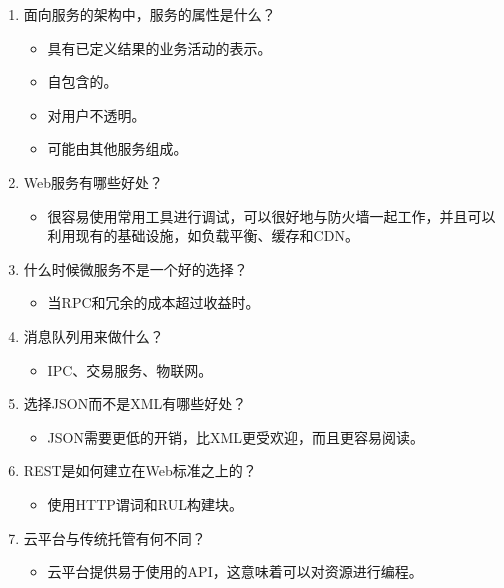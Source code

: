 \begin{enumerate}
\item
面向服务的架构中，服务的属性是什么？
\begin{itemize}
\item 
具有已定义结果的业务活动的表示。

\item 
自包含的。

\item 
对用户不透明。

\item 
可能由其他服务组成。
\end{itemize}

\item
Web服务有哪些好处？
\begin{itemize}
\item 
很容易使用常用工具进行调试，可以很好地与防火墙一起工作，并且可以利用现有的基础设施，如负载平衡、缓存和CDN。
\end{itemize}

\item
什么时候微服务不是一个好的选择？
\begin{itemize}
\item 
当RPC和冗余的成本超过收益时。
\end{itemize}

\item
消息队列用来做什么？
\begin{itemize}
\item 
IPC、交易服务、物联网。
\end{itemize}

\item
选择JSON而不是XML有哪些好处？
\begin{itemize}
\item 
JSON需要更低的开销，比XML更受欢迎，而且更容易阅读。
\end{itemize}

\item
REST是如何建立在Web标准之上的？
\begin{itemize}
\item 
使用HTTP谓词和RUL构建块。
\end{itemize}

\item
云平台与传统托管有何不同？
\begin{itemize}
\item 
云平台提供易于使用的API，这意味着可以对资源进行编程。
\end{itemize}
\end{enumerate}